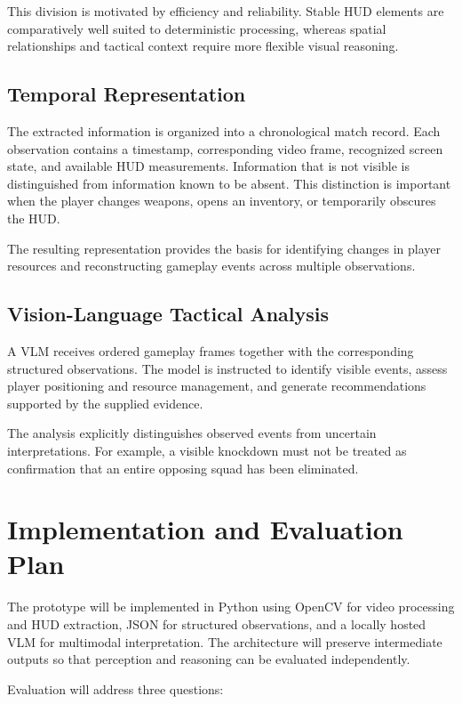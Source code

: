 \documentclass[10pt,letterpaper]{article}
\begin{document}
This division is motivated by efficiency and reliability. Stable HUD
elements are comparatively well suited to deterministic processing,
whereas spatial relationships and tactical context require more
flexible visual reasoning.

\subsection{Temporal Representation}

The extracted information is organized into a chronological match
record. Each observation contains a timestamp, corresponding video
frame, recognized screen state, and available HUD measurements.
Information that is not visible is distinguished from information
known to be absent. This distinction is important when the player
changes weapons, opens an inventory, or temporarily obscures the HUD.

The resulting representation provides the basis for identifying
changes in player resources and reconstructing gameplay events across
multiple observations.

\subsection{Vision-Language Tactical Analysis}

A VLM receives ordered gameplay frames together with the corresponding
structured observations. The model is instructed to identify visible
events, assess player positioning and resource management, and generate
recommendations supported by the supplied evidence.

The analysis explicitly distinguishes observed events from uncertain
interpretations. For example, a visible knockdown must not be treated
as confirmation that an entire opposing squad has been eliminated.

\section{Implementation and Evaluation Plan}

The prototype will be implemented in Python using OpenCV for video
processing and HUD extraction, JSON for structured observations, and a
locally hosted VLM for multimodal interpretation. The architecture
will preserve intermediate outputs so that perception and reasoning
can be evaluated independently.

Evaluation will address three questions:
\end{document}
